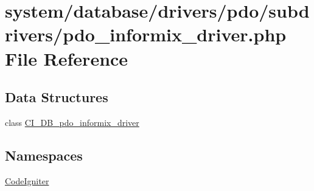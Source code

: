 \hypertarget{pdo__informix__driver_8php}{}\section{system/database/drivers/pdo/subdrivers/pdo\+\_\+informix\+\_\+driver.php File Reference}
\label{pdo__informix__driver_8php}
\subsection*{Data Structures}
\begin{DoxyCompactItemize}
\item 
class \mbox{\hyperlink{class_c_i___d_b__pdo__informix__driver}{C\+I\+\_\+\+D\+B\+\_\+pdo\+\_\+informix\+\_\+driver}}
\end{DoxyCompactItemize}
\subsection*{Namespaces}
\begin{DoxyCompactItemize}
\item 
 \mbox{\hyperlink{namespace_code_igniter}{Code\+Igniter}}
\end{DoxyCompactItemize}
